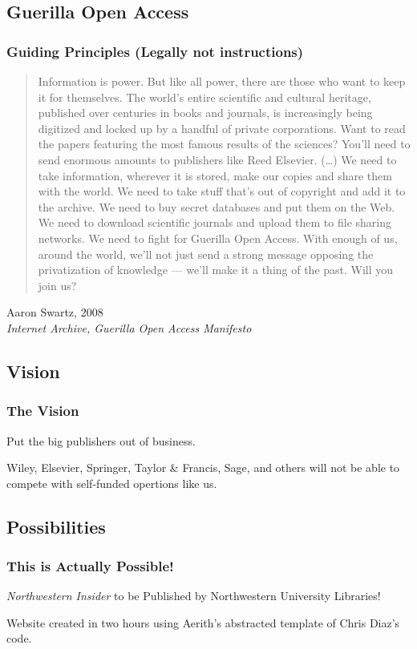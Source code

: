 \documentclass[aspectratio=169,9pt,xcolor=dvipsnames]{beamer}
\begin{document}
\subsection{Guerilla Open Access}
\begin{frame}
    \frametitle{Guiding Principles (Legally not instructions)}
\begin{quotation}
    Information is power. But like all power, there are those who want to keep it for themselves. The world’s entire scientific and cultural heritage, published over centuries in books and journals, is increasingly being digitized and locked up by a handful of private corporations. Want to read the papers featuring the most famous results of the sciences? You’ll need to send enormous amounts to publishers like Reed Elsevier.
(…)
We need to take information, wherever it is stored, make our copies and share them with the world. We need to take stuff that’s out of copyright and add it to the archive. We need to buy secret databases and put them on the Web. We need to download scientific journals and upload them to file sharing networks. We need to fight for Guerilla Open Access.
With enough of us, around the world, we’ll not just send a strong message opposing the privatization of knowledge — we’ll make it a thing of the past. Will you join us?
\end{quotation}
\begin{flushright}
    Aaron Swartz, 2008
    \\ \textit{Internet Archive, Guerilla Open Access Manifesto}
\end{flushright}
\end{frame}
\subsection{Vision}
\begin{frame}
    \frametitle{The Vision}
    \begin{center}
        \huge{Put the big publishers out of business.}
    \end{center}
    \begin{center}
        \small{Wiley, Elsevier, Springer, Taylor \& Francis, Sage, and others will not be able to compete with self-funded opertions like us.}
    \end{center}
\end{frame}

\subsection{Possibilities}
\begin{frame}
    \frametitle{This is Actually Possible!}
    \begin{center}
        \huge{\textit{Northwestern Insider} to be Published by Northwestern University Libraries!}
    \end{center}
    \begin{center}
        \large{Website created in two hours using Aerith's abstracted template of Chris Diaz's code.}
    \end{center}
\end{frame}
\end{document}
